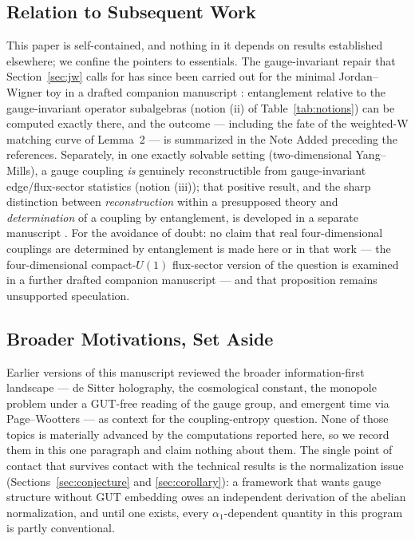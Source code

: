 \documentclass[11pt]{article}
\begin{document}
\subsection{Relation to Subsequent Work}
\label{sec:series}

This paper is self-contained, and nothing in it depends on results established elsewhere; we confine the pointers to essentials. The gauge-invariant repair that Section~\ref{sec:jw} calls for has since been carried out for the minimal Jordan--Wigner toy in a drafted companion manuscript \cite{paper2}: entanglement relative to the gauge-invariant operator subalgebras (notion (ii) of Table~\ref{tab:notions}) can be computed exactly there, and the outcome --- including the fate of the weighted-W matching curve of Lemma~2 --- is summarized in the Note Added preceding the references. Separately, in one exactly solvable setting (two-dimensional Yang--Mills), a gauge coupling \emph{is} genuinely reconstructible from gauge-invariant edge/flux-sector statistics (notion (iii)); that positive result, and the sharp distinction between \emph{reconstruction} within a presupposed theory and \emph{determination} of a coupling by entanglement, is developed in a separate manuscript \cite{paper3}. For the avoidance of doubt: no claim that real four-dimensional couplings are determined by entanglement is made here or in that work --- the four-dimensional compact-$U(1)$ flux-sector version of the question is examined in a further drafted companion manuscript \cite{paper5} --- and that proposition remains unsupported speculation.

\subsection{Broader Motivations, Set Aside}
\label{sec:broader}

Earlier versions of this manuscript reviewed the broader information-first landscape --- de Sitter holography, the cosmological constant, the monopole problem under a GUT-free reading of the gauge group, and emergent time via Page--Wootters \cite{page} --- as context for the coupling-entropy question. None of those topics is materially advanced by the computations reported here, so we record them in this one paragraph and claim nothing about them. The single point of contact that survives contact with the technical results is the normalization issue (Sections~\ref{sec:conjecture} and \ref{sec:corollary}): a framework that wants gauge structure without GUT embedding owes an independent derivation of the abelian normalization, and until one exists, every $\alpha_1$-dependent quantity in this program is partly conventional.
\end{document}
